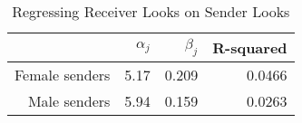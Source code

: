 \begin{table}[ht]
\centering
\caption{Regressing Receiver Looks on Sender Looks} 
\label{tab:receiver_on_sender}
\begin{tabular}{rrrr}
  \hline
 & $\alpha_j$ & $\beta_j$ & R-squared \\ 
  \hline
Female senders & 5.17 & 0.209 & 0.0466 \\ 
  Male senders & 5.94 & 0.159 & 0.0263 \\ 
   \hline
\end{tabular}
\end{table}
